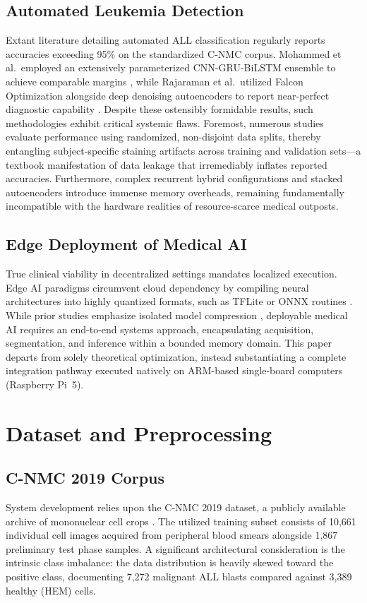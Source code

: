 \documentclass[journal]{IEEEtran}
\begin{document}
\subsection{Automated Leukemia Detection}
Extant literature detailing automated ALL classification regularly reports accuracies exceeding 95\% on the standardized C-NMC corpus. Mohammed et al.\ employed an extensively parameterized CNN-GRU-BiLSTM ensemble to achieve comparable margins \cite{b7}, while Rajaraman et al.\ utilized Falcon Optimization alongside deep denoising autoencoders to report near-perfect diagnostic capability \cite{b10}. Despite these ostensibly formidable results, such methodologies exhibit critical systemic flaws. Foremost, numerous studies evaluate performance using randomized, non-disjoint data splits, thereby entangling subject-specific staining artifacts across training and validation sets---a textbook manifestation of data leakage that irremediably inflates reported accuracies. Furthermore, complex recurrent hybrid configurations and stacked autoencoders introduce immense memory overheads, remaining fundamentally incompatible with the hardware realities of resource-scarce medical outposts.

\subsection{Edge Deployment of Medical AI}
True clinical viability in decentralized settings mandates localized execution. Edge AI paradigms circumvent cloud dependency by compiling neural architectures into highly quantized formats, such as TFLite or ONNX routines \cite{b_tflite, b_onnx}. While prior studies emphasize isolated model compression \cite{b12}, deployable medical AI requires an end-to-end systems approach, encapsulating acquisition, segmentation, and inference within a bounded memory domain. This paper departs from solely theoretical optimization, instead substantiating a complete integration pathway executed natively on ARM-based single-board computers (Raspberry Pi~5).

\section{Dataset and Preprocessing}
\subsection{C-NMC 2019 Corpus}
System development relies upon the C-NMC 2019 dataset, a publicly available archive of mononuclear cell crops \cite{b5}. The utilized training subset consists of 10,661 individual cell images acquired from peripheral blood smears alongside 1,867 preliminary test phase samples. A significant architectural consideration is the intrinsic class imbalance: the data distribution is heavily skewed toward the positive class, documenting 7,272 malignant ALL blasts compared against 3,389 healthy (HEM) cells.
\end{document}

